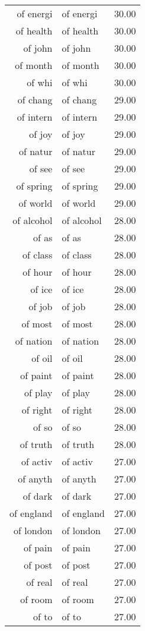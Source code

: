\begin{table}[ht]
\begin{tabular}{rlr}
  of energi & of energi & 30.00 \\ 
  of health & of health & 30.00 \\ 
  of john & of john & 30.00 \\ 
  of month & of month & 30.00 \\ 
  of whi & of whi & 30.00 \\ 
  of chang & of chang & 29.00 \\ 
  of intern & of intern & 29.00 \\ 
  of joy & of joy & 29.00 \\ 
  of natur & of natur & 29.00 \\ 
  of see & of see & 29.00 \\ 
  of spring & of spring & 29.00 \\ 
  of world & of world & 29.00 \\ 
  of alcohol & of alcohol & 28.00 \\ 
  of as & of as & 28.00 \\ 
  of class & of class & 28.00 \\ 
  of hour & of hour & 28.00 \\ 
  of ice & of ice & 28.00 \\ 
  of job & of job & 28.00 \\ 
  of most & of most & 28.00 \\ 
  of nation & of nation & 28.00 \\ 
  of oil & of oil & 28.00 \\ 
  of paint & of paint & 28.00 \\ 
  of play & of play & 28.00 \\ 
  of right & of right & 28.00 \\ 
  of so & of so & 28.00 \\ 
  of truth & of truth & 28.00 \\ 
  of activ & of activ & 27.00 \\ 
  of anyth & of anyth & 27.00 \\ 
  of dark & of dark & 27.00 \\ 
  of england & of england & 27.00 \\ 
  of london & of london & 27.00 \\ 
  of pain & of pain & 27.00 \\ 
  of post & of post & 27.00 \\ 
  of real & of real & 27.00 \\ 
  of room & of room & 27.00 \\ 
  of to & of to & 27.00 \\ 

\end{tabular}
\end{table}
